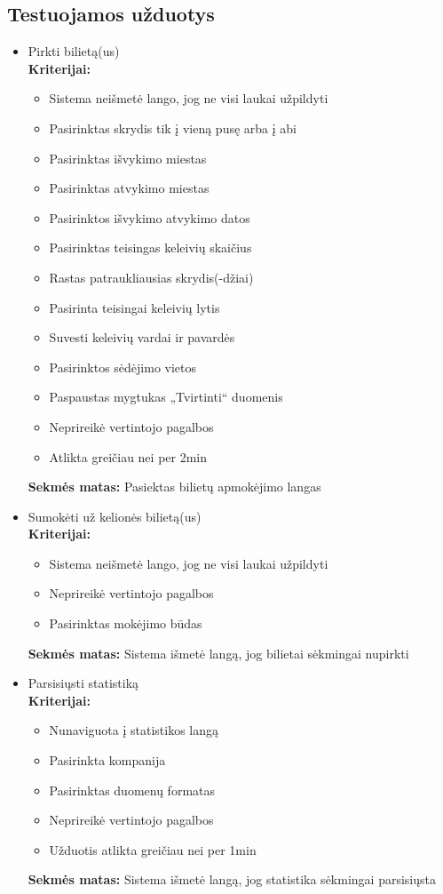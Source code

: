 \documentclass{VUMIFPSkursinis}
\begin{document}
\subsection{Testuojamos užduotys}
\begin{itemize}
\item Pirkti bilietą(us) \\
	\textbf{Kriterijai:}
	\begin{itemize}
	\item Sistema neišmetė lango, jog ne visi laukai užpildyti
	\item Pasirinktas skrydis tik į vieną pusę arba į abi
	\item Pasirinktas išvykimo miestas
	\item Pasirinktas atvykimo miestas
	\item Pasirinktos išvykimo atvykimo datos
	\item Pasirinktas teisingas keleivių skaičius
	\item Rastas patraukliausias skrydis(-džiai)
	\item Pasirinta teisingai keleivių lytis
	\item Suvesti keleivių vardai ir pavardės
	\item Pasirinktos sėdėjimo vietos
	\item Paspaustas mygtukas „Tvirtinti“ duomenis
	\item Neprireikė vertintojo pagalbos
	\item Atlikta greičiau nei per 2min
	\end{itemize}
	\textbf{Sekmės matas:} Pasiektas bilietų apmokėjimo langas \\

\item Sumokėti už kelionės bilietą(us)  \\
	\textbf{Kriterijai:}
	\begin{itemize}
	\item Sistema neišmetė lango, jog ne visi laukai užpildyti
	\item Neprireikė vertintojo pagalbos
	\item Pasirinktas mokėjimo būdas
	\end{itemize}
	\textbf{Sekmės matas:} Sistema išmetė langą, jog bilietai sėkmingai nupirkti \\

\item Parsisiųsti statistiką  \\
	\textbf{Kriterijai:}
	\begin{itemize}
	\item Nunaviguota į statistikos langą
	\item Pasirinkta kompanija
	\item Pasirinktas duomenų formatas
	\item Neprireikė vertintojo pagalbos
	\item Užduotis atlikta greičiau nei per 1min
	\end{itemize}
	\textbf{Sekmės matas:} Sistema išmetė langą, jog statistika sėkmingai parsisiųsta \\


\end{itemize}
\end{document}
